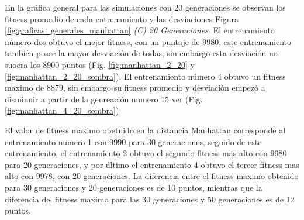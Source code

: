 \documentclass[conference]{IEEEtran}
\begin{document}
En la gráfica general para las simulaciones con 20 generaciones se observan los fitness promedio de cada entrenamiento y las desviaciones Figura \ref{fig:graficas_generales_manhattan} \textit{(C) 20 Generaciones}.
El entrenamiento número dos obtuvo el mejor fitness, con un puntaje de 9980, este entrenamiento también posee la mayor desviación de todas, sin embargo esta desviación no suoera los 8900 puntos (Fig. \ref{fig:manhattan_2_20} y \ref{fig:manhattan_2_20_sombra}). El entrenamiento número 4 obtuvo un fitness maximo de 8879, sin embargo su fitness promedio y desviación empezó a disminuir a partir de la genreación numero 15 ver (Fig. \ref{fig:manhattan_4_20_sombra})

El valor de fitness maximo obetnido en la distancia Manhattan corresponde al entrenamiento numero 1 con 9990 para 30 generaciones, seguido de este entrenamiento, el entrenamiento 2 obtuvo el segundo fitness mas alto con 9980 para 20 generaciones, y por último el entrenamiento 4 obtuvo el tercer fitness mas alto con 9978, con 20 generaciones. La diferencia entre el fitness maximo obtenido para 30 generaciones y 20 generaciones es de 10 puntos, mientras que la diferencia del fitness maximo para las 30 generaciones y 50 generaciones es de 12 puntos.
\end{document}
